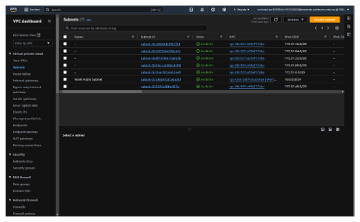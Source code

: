 \documentclass[11pt]{article}
\begin{document}
\begin{enumerate}[resume]
    {\centering
    \includegraphics[width=5.8in]{pics/4.png}
    }
\end{enumerate}
\end{document}
